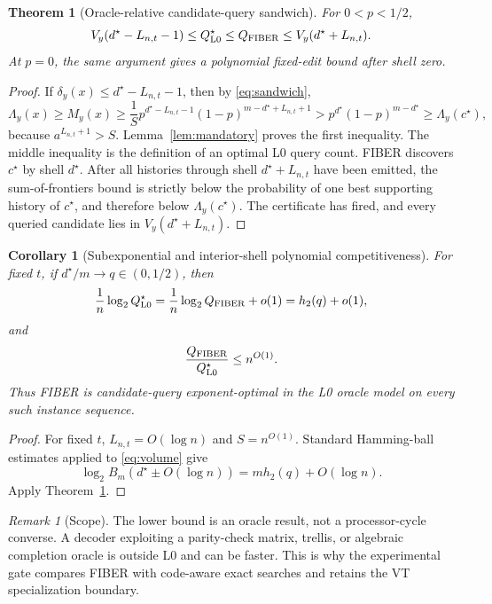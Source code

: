 \documentclass[11pt]{article}
\newtheorem{theorem}{Theorem}
\newtheorem{corollary}{Corollary}
\theoremstyle{definition}
\theoremstyle{remark}
\newtheorem{remark}{Remark}
\newcommand{\Qfib}{Q_{\rm FIBER}}
\newcommand{\Qopt}{Q_{\rm L0}^{\star}}
\newcommand{\hbin}{h_2}
\begin{document}
\begin{theorem}[Oracle-relative candidate-query sandwich]
\label{thm:oracle}
For $0<p<1/2$,
\begin{equation}
V_y(d^\star-L_{n,t}-1)
\le \Qopt
\le \Qfib
\le V_y(d^\star+L_{n,t}).
\label{eq:oracle}
\end{equation}
At $p=0$, the same argument gives a polynomial fixed-edit bound after shell zero.
\end{theorem}
\begin{proof}
If $\delta_y(x)\le d^\star-L_{n,t}-1$, then by \eqref{eq:sandwich},
\[
\Lambda_y(x)\ge M_y(x)
\ge \frac1S p^{d^\star-L_{n,t}-1}(1-p)^{m-d^\star+L_{n,t}+1}
>p^{d^\star}(1-p)^{m-d^\star}
\ge\Lambda_y(c^\star),
\]
because $a^{L_{n,t}+1}>S$.  Lemma~\ref{lem:mandatory} proves the first inequality.  The middle inequality is the definition of an optimal L0 query count.  FIBER discovers $c^\star$ by shell $d^\star$.  After all histories through shell $d^\star+L_{n,t}$ have been emitted, the sum-of-frontiers bound is strictly below the probability of one best supporting history of $c^\star$, and therefore below $\Lambda_y(c^\star)$.  The certificate has fired, and every queried candidate lies in $V_y(d^\star+L_{n,t})$.
\end{proof}

\begin{corollary}[Subexponential and interior-shell polynomial competitiveness]
\label{cor:competitive}
For fixed $t$, if $d^\star/m\to q\in(0,1/2)$, then
\[
\frac1n\log_2\Qopt
=\frac1n\log_2\Qfib+o(1)
=\hbin(q)+o(1),
\]
and
\[
\frac{\Qfib}{\Qopt}\le n^{O(1)}.
\]
Thus FIBER is candidate-query exponent-optimal in the L0 oracle model on every such instance sequence.
\end{corollary}
\begin{proof}
For fixed $t$, $L_{n,t}=O(\log n)$ and $S=n^{O(1)}$.  Standard Hamming-ball estimates applied to \eqref{eq:volume} give
\[
\log_2 B_m(d^\star\pm O(\log n))=m\hbin(q)+O(\log n).
\]
Apply Theorem~\ref{thm:oracle}.
\end{proof}

\begin{remark}[Scope]
The lower bound is an oracle result, not a processor-cycle converse.  A decoder exploiting a parity-check matrix, trellis, or algebraic completion oracle is outside L0 and can be faster.  This is why the experimental gate compares FIBER with code-aware exact searches and retains the VT specialization boundary.
\end{remark}
\end{document}
